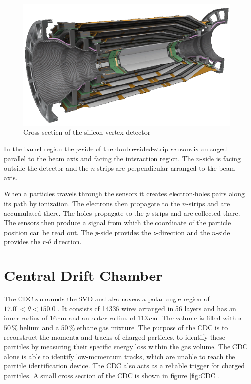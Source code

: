 \documentclass[a4paper,11pt,twosided,final,german,openbib,pdftex,listof=totoc,bibliography=totoc]{scrbook}
\begin{document}
\begin{figure}[h!]
	\centering
	\includegraphics[width=\textwidth]{Bilder/SVD.png}
	\caption[Silicon Vertex Detector]{Cross section of the silicon vertex detector\cite{SVDItalian}}
	\label{fig:SiliconVertex}
\end{figure}

In the barrel region the $p$-side of the double-sided-strip sensors is arranged parallel to the beam axis and facing the interaction region. The $n$-side is facing outside the detector and the $n$-strips are perpendicular arranged to the beam axis. 

When a particles travels through the sensors it creates electron-holes pairs along its path by ionization. The electrons then propagate to the $n$-strips and are accumulated there. The holes propagate to the $p$-strips and are collected there. The sensors then produce a signal from which the coordinate of the particle position can be read out. The $p$-side provides the $z$-direction and the $n$-side provides the $r$-$\theta$ direction.\cite{B2TR} \cite{bergauer2010silicon}



\section{Central Drift Chamber}
\label{sec:CDC}

The CDC surrounds the SVD and also covers a polar angle region of $17.0^{\circ} < \theta < 150.0^{\circ}$. It consists of 14336 wires arranged in 56 layers and has an inner radius of $16\,\textrm{cm}$ and an outer radius of $113\,\textrm{cm}$. The volume is filled with a $50\,\%$ helium and a $50\,\%$ ethane gas mixture. The purpose of the CDC is to reconstruct the momenta and tracks of charged particles, to identify these particles by measuring their specific energy loss within the gas volume. The CDC alone is able to identify low-momentum tracks, which are unable to reach the particle identification device. The CDC also acts as a reliable trigger for charged particles.\cite{B2TR} A small cross section of the CDC is shown in figure \ref{fig:CDC}.
\end{document}
